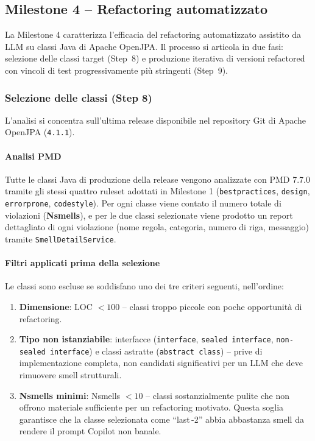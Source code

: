 \subsection{Milestone 4 -- Refactoring automatizzato}

La Milestone 4 caratterizza l'efficacia del refactoring automatizzato assistito da LLM
su classi Java di Apache OpenJPA. Il processo si articola in due fasi: selezione delle
classi target (Step~8) e produzione iterativa di versioni refactored con vincoli di test
progressivamente più stringenti (Step~9).

\subsubsection{Selezione delle classi (Step 8)}

L'analisi si concentra sull'ultima release disponibile nel repository Git di Apache
OpenJPA (\texttt{4.1.1}).

\paragraph{Analisi PMD}

Tutte le classi Java di produzione della release vengono analizzate con PMD 7.7.0
tramite gli stessi quattro ruleset adottati in Milestone 1
(\texttt{bestpractices}, \texttt{design}, \texttt{errorprone}, \texttt{codestyle}).
Per ogni classe viene contato il numero totale di violazioni (\textbf{Nsmells}),
e per le due classi selezionate viene prodotto un report dettagliato di ogni violazione
(nome regola, categoria, numero di riga, messaggio) tramite \texttt{SmellDetailService}.

\paragraph{Filtri applicati prima della selezione}

Le classi sono escluse se soddisfano uno dei tre criteri seguenti, nell'ordine:

\begin{enumerate}
  \item \textbf{Dimensione}: LOC $< 100$ -- classi troppo piccole con poche opportunità
        di refactoring.
  \item \textbf{Tipo non istanziabile}: interfacce (\texttt{interface},
        \texttt{sealed interface}, \texttt{non-sealed interface}) e classi astratte
        (\texttt{abstract class}) -- prive di implementazione completa, non candidati
        significativi per un LLM che deve rimuovere smell strutturali.
  \item \textbf{Nsmells minimi}: Nsmells $< 10$ -- classi sostanzialmente pulite che
        non offrono materiale sufficiente per un refactoring motivato. Questa soglia
        garantisce che la classe selezionata come ``last\,-2'' abbia abbastanza smell da
        rendere il prompt Copilot non banale.
\end{enumerate}


